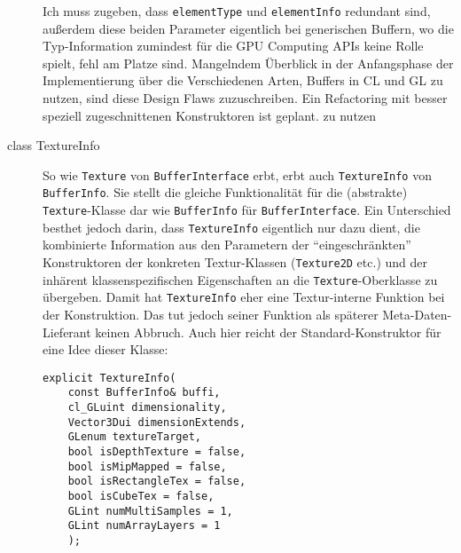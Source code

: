 \begin{description}
		Ich muss zugeben, dass \lstinline|elementType| und \lstinline|elementInfo| redundant sind, außerdem diese 
		beiden Parameter eigentlich bei generischen Buffern, wo die Typ-Information zumindest für die GPU Computing APIs
		keine Rolle spielt, fehl am Platze sind. Mangelndem Überblick in der Anfangsphase der Implementierung
		über die Verschiedenen Arten, Buffers in CL und GL zu nutzen, sind diese Design Flaws zuzuschreiben.
		Ein Refactoring mit besser speziell zugeschnittenen Konstruktoren ist geplant.
		zu nutzen
	
	\item[class TextureInfo]
		So wie \lstinline|Texture| von \lstinline|BufferInterface| erbt, erbt auch 
		\lstinline|TextureInfo| von \lstinline|BufferInfo|. Sie stellt die gleiche Funktionalität für
		die (abstrakte) \lstinline|Texture|-Klasse dar wie \lstinline|BufferInfo| für \lstinline|BufferInterface|.
		Ein Unterschied besthet jedoch darin, dass \lstinline|TextureInfo| eigentlich nur dazu dient, 
		die kombinierte Information aus den Parametern der "`eingeschränkten"' Konstruktoren 
		der konkreten Textur-Klassen (\lstinline|Texture2D| etc.) und der inhärent klassenspezifischen
		Eigenschaften an die \lstinline|Texture|-Oberklasse zu übergeben. Damit hat \lstinline|TextureInfo|
		eher eine Textur-interne Funktion bei der Konstruktion. Das tut jedoch seiner Funktion als späterer
		Meta-Daten-Lieferant keinen Abbruch.
		Auch hier reicht der Standard-Konstruktor für eine Idee dieser Klasse:
		 
		\begin{lstlisting}	
explicit TextureInfo(
	const BufferInfo& buffi,
	cl_GLuint dimensionality,
	Vector3Dui dimensionExtends,
	GLenum textureTarget,
	bool isDepthTexture = false,
	bool isMipMapped = false,
	bool isRectangleTex = false,
	bool isCubeTex = false,
	GLint numMultiSamples = 1,
	GLint numArrayLayers = 1
	);
		\end{lstlisting}			
			
	\end{description}	

